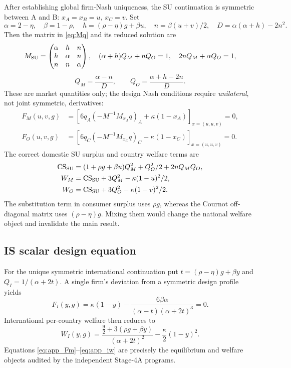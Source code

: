 After establishing global firm-Nash uniqueness, the SU continuation
is symmetric between A and B: $x_A=x_B=u$, $x_C=v$. Set
\begin{equation}\label{eq:app_mn}
 \alpha=2-\eta,\quad \beta=1-\rho,\quad
 h=(\rho-\eta)g+\beta u,\quad
 n=\beta(u+v)/2,\quad D=\alpha(\alpha+h)-2n^2.
\end{equation}
Then the matrix in \eqref{eq:Mq} and its reduced solution are
\begin{equation}\label{eq:app_market}
 M_{\mathrm{SU}}=\begin{pmatrix}
 \alpha & h & n\\ h & \alpha & n\\ n & n & \alpha
 \end{pmatrix},\quad
 (\alpha+h)Q_M+nQ_O=1,\quad 2nQ_M+\alpha Q_O=1,
\end{equation}
\begin{equation}\label{eq:app_quantities}
 Q_M=\frac{\alpha-n}{D},\qquad
 Q_O=\frac{\alpha+h-2n}{D}.
\end{equation}
These are market quantities only; the design Nash conditions require
\emph{unilateral}, not joint symmetric, derivatives:
\begin{align}
 F_M(u,v,g)
 &=\left[6q_A(-M^{-1}M_{x_A}q)_A+
                  \kappa(1-x_A)\right]_{x=(u,u,v)}=0,
 \label{eq:app_Fm}\\
 F_O(u,v,g)
 &=\left[6q_C(-M^{-1}M_{x_C}q)_C+
                  \kappa(1-x_C)\right]_{x=(u,u,v)}=0.
 \label{eq:app_Fo}
\end{align}
The correct domestic SU surplus and country welfare terms are
\begin{align}
 \mathrm{CS}_{\mathrm{SU}}&=(1+\rho g+\beta u)Q_M^2+
                    Q_O^2/2+2nQ_MQ_O,\label{eq:app_cs}\\
 W_M&=\mathrm{CS}_{\mathrm{SU}}+3Q_M^2-\kappa(1-u)^2/2,\label{eq:app_wm}\\
 W_O&=\mathrm{CS}_{\mathrm{SU}}+3Q_O^2-\kappa(1-v)^2/2.\label{eq:app_wo}
\end{align}
The substitution term in consumer surplus uses $\rho g$,
whereas the Cournot off-diagonal matrix uses $(\rho-\eta)g$.
Mixing them would change the national welfare object and
invalidate the main result.

\subsection{IS scalar design equation}

For the unique symmetric international continuation put
$t=(\rho-\eta)g+\beta y$ and $Q_I=1/(\alpha+2t)$.
A single firm's deviation from a symmetric design profile yields
\begin{equation}\label{eq:app_isf}
 F_I(y,g)=\kappa(1-y)-
  \frac{6\beta\alpha}{(\alpha-t)(\alpha+2t)^3}=0.
\end{equation}
International per-country welfare then reduces to
\begin{equation}\label{eq:app_iw}
 W_I(y,g)=
 \frac{\tfrac92+3(\rho g+\beta y)}{(\alpha+2t)^2}
 -\frac{\kappa}{2}(1-y)^2 .
\end{equation}
Equations \eqref{eq:app_Fm}--\eqref{eq:app_iw} are precisely
the equilibrium and welfare objects audited by the
independent Stage-4A programs.

